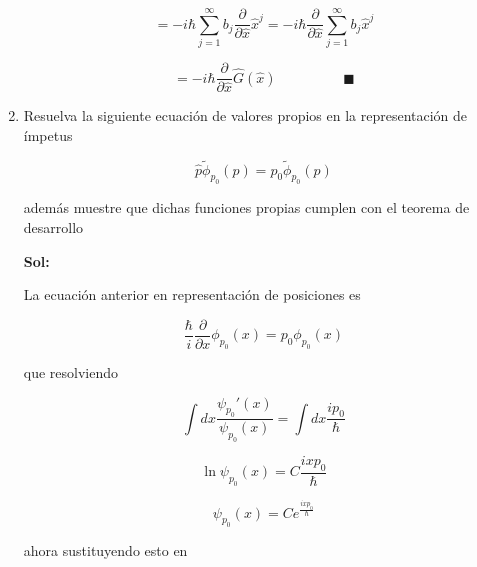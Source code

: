 \documentclass[12pt,a4paper]{article}
\begin{document}
\begin{enumerate}
        \begin{equation*}
            =   - i  \hbar \sum_{j=1}^{\infty} b_j  \frac{\partial}{\partial \hat{x}} \hat{x}^{j}=   - i  \hbar\frac{\partial}{\partial \hat{x}} \sum_{j=1}^{\infty} b_j   \hat{x}^{j}
        \end{equation*}
        
        \begin{equation*}
            =- i  \hbar\frac{\partial}{\partial \hat{x}} \hat{G} (\hat{x}) \hspace{2cm} \blacksquare 
        \end{equation*}
    
    
    
    
    
    
    \item Resuelva la siguiente ecuación de valores propios en la representación de ímpetus
    
    \begin{equation*}
        \hat{p} \tilde{\phi}_{p_0}(p)= p_0\tilde{ \phi}_{p_0}(p)
    \end{equation*}
    
    además muestre que dichas funciones propias cumplen con el teorema de desarrollo
    
    \textbf{Sol:}
    
    La ecuación anterior en representación de posiciones es
    
    \begin{equation*}
        \frac{\hbar}{i} \frac{\partial}{ \partial x} \phi_{p_0}(x) = p_0 \phi_{p_0}(x)
    \end{equation*}
    
    que resolviendo
    
    \begin{equation*}
        \int dx \frac{\psi_{p_0}'(x)}{\psi_{p_0}(x)} =\int dx \frac{i p_0 }{\hbar}
    \end{equation*}
    
    \begin{equation*}
        \ln{\psi_{p_0}(x)} =C \frac{i x p_0 }{\hbar} 
    \end{equation*}
    
    \begin{equation*}
        \psi_{p_0}(x) = C e^{\frac{i x p_0 }{\hbar} }
    \end{equation*}
    
    ahora sustituyendo esto en
    

\end{enumerate}
\end{document}
